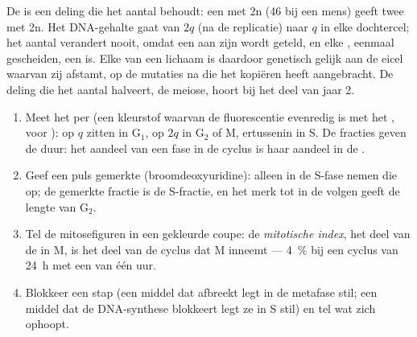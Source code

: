 \begin{proposition}\label{prop:b1:replication-mitosis:conserves}
De  is een deling die het aantal  behoudt: een  met 2n
 (46 bij een mens) geeft twee  met 2n. Het DNA-gehalte gaat van
$2q$ (na de replicatie) naar $q$ in elke dochtercel; het aantal 
verandert nooit, omdat een  aan zijn  wordt geteld, en elke
, eenmaal gescheiden, een  is. Elke  van een lichaam is
daardoor genetisch gelijk aan de eicel waarvan zij afstamt, op de mutaties na die
het kopiëren heeft aangebracht. De deling die het aantal  halveert, de
meiose, hoort bij het deel van jaar 2.
\end{proposition}

\begin{method}\label{met:b1:replication-mitosis:reading}
\begin{enumerate}
  \item Meet het  per  (een kleurstof waarvan de fluorescentie
        evenredig is met het ,  voor ):  op $q$ zitten in
        G$_1$, op $2q$ in G$_2$ of M, ertussenin in S. De fracties geven de
        duur: het aandeel van een fase in de cyclus is haar aandeel in de
        .
  \item Geef een puls gemerkte  (broomdeoxyuridine): alleen
         in de S-fase nemen die op; de gemerkte fractie is de
        S-fractie, en het merk tot in de  volgen geeft de lengte van
        G$_2$.
  \item Tel de mitosefiguren in een gekleurde coupe: de \emph{mitotische
        index}, het deel van de  in M, is het deel van de cyclus dat
        M inneemt --- \qty{4}{\%} bij een cyclus van \qty{24}{h} met een
         van één uur.
  \item Blokkeer een stap (een middel dat  afbreekt legt 
        in de metafase stil; een middel dat de DNA-synthese blokkeert legt
        ze in S stil) en tel wat zich ophoopt.
\end{enumerate}
\end{method}

